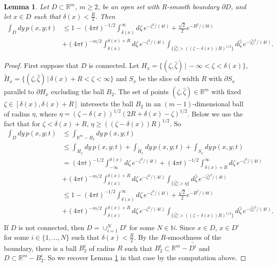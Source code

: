 \documentclass[a4paper,9pt]{amsart}
\newtheorem{lemma}[theorem]{Lemma}
\begin{document}
\begin{lemma}\label{L:uppersol}
Let $D \subset \mathbb{R}^{m}$, $m \geq 2$, be an open set with
$R$-smooth boundary $\partial D$, and let $x \in
D$ such that $\delta(x)<\frac{R}{2}$. Then
\begin{align*}
\int_{D}dy\, p(x,y;t) &\leq 1 -(4\pi
t)^{-1/2}\int_{\delta(x)}^{\infty} d\zeta \,
e^{-\zeta^{2}/(4t)} + \frac{\sqrt{2}}{2}e^{-R^{2}/(8t)}\\
& + (4\pi t)^{-m/2}\int_{\delta(x)}^{\delta(x)+R} d\zeta \,
e^{-\zeta^{2}/(4t)} \int_{\{\vert \hat{\zeta} \vert >
((\zeta-\delta(x))R)^{1/2}\}} d\hat{\zeta} \, e^{-\vert
\hat{\zeta} \vert^{2}/(4t)}.
\end{align*}
\end{lemma}
\begin{proof} First suppose that $D$ is connected. Let $H_{x} = \{(\zeta,\hat{\zeta}) \, \vert \, -\infty < \zeta < \delta(x)\}$,
$\tilde{H}_{x} = \{(\zeta,\hat{\zeta}) \, \vert \, \delta(x) +R <
\zeta < \infty\}$ and $S_{x}$ be the slice of width $R$ with
$\partial S_{x}$ parallel to $\partial H_{x}$ excluding the ball
$B_{2}$. The set of points  $(\zeta, \hat{\zeta})\in {\mathbb{R}}^m$ with
fixed $\zeta \in [\delta(x), \delta(x)+R]$ intersects the ball
$B_{2}$ in an $(m-1)$-dimensional ball of radius $\eta$, where
$\eta=(\zeta-\delta(x))^{1/2}(2R+\delta(x)-\zeta)^{1/2}$. Below we
use the fact that for $\zeta < \delta(x) +R$, $\eta \geq
((\zeta-\delta(x))R)^{1/2}$. So
\begin{align*}
\int_{D}dy \, p(x,y;t)
&\leq \int_{\mathbb{R}^{m}-B_{2}} dy \, p(x,y;t)\\
&\leq \int_{H_{x}} dy \, p(x,y;t) + \int_{\tilde{H}_{x}} dy \, p(x,y;t) + \int_{S_{x}} dy \, p(x,y;t)\\
&=(4\pi t)^{-1/2}\int_{-\infty}^{\delta(x)} d\zeta \,
e^{-\zeta^{2}/(4t)}
+(4\pi t)^{-1/2}\int_{\delta(x)+R}^{\infty} d\zeta \, e^{-\zeta^{2}/(4t)}\\
&+(4\pi t)^{-m/2}\int_{\delta(x)}^{\delta(x)+R} d\zeta \,
e^{-\zeta^{2}/(4t)}
\int_{\{\vert \hat{\zeta} \vert > \eta\}} d\hat{\zeta} \, e^{-\vert \hat{\zeta} \vert^{2}/(4t)}\\
&\leq 1 - (4\pi t)^{-1/2}\int_{\delta(x)}^{\infty} d\zeta \,
e^{-\zeta^{2}/(4t)}
+\frac{\sqrt{2}}{2}e^{-R^{2}/(8t)}\\
&+ (4\pi t)^{-m/2}\int_{\delta(x)}^{\delta(x)+R} d\zeta \,
e^{-\zeta^{2}/(4t)} \int_{\{\vert \hat{\zeta} \vert >
((\zeta-\delta(x))R)^{1/2}\}} d\hat{\zeta} \,
e^{-\vert \hat{\zeta} \vert^{2}/(4t)}.\\
\end{align*}
If $D$ is not connected, then $D=\cup_{i=1}^{N} D^{i}$ for some $N
\in \mathbb{N}$. Since $x \in D$, $x \in D^{i}$ for some $i \in
\{1, \dots, N\}$ such that $\delta(x)<\frac{R}{2}$. By the
$R$-smoothness of the boundary, there is a ball $B_{2}^{i}$ of
radius $R$ such that $B_{2}^{i} \subset \mathbb{R}^{m} -
\bar{D^{i}}$ and $D \subset \mathbb{R}^{m} - B_{2}^{i}$. So we
recover Lemma \ref{L:uppersol} in that case by the computation
above.
\end{proof}
\end{document}
